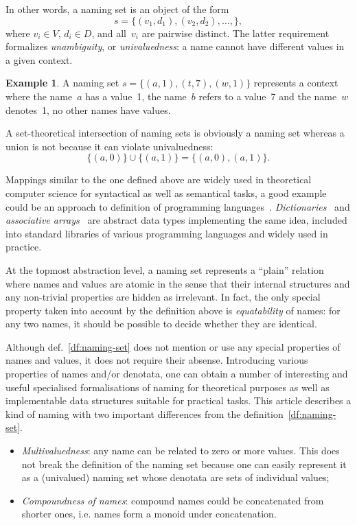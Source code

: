 \documentclass{article}
\theoremstyle{definition}
\newtheorem{Ex}{Example}
\begin{document}
In other words, a naming set is an object of the form
\[
  s = \{ (v_1, d_1), (v_2, d_2), \ldots, \} ,
\]
where $v_i\in V$, $d_i\in D$, and all~$v_i$ are pairwise distinct. The
latter requirement formalizes \emph{unambiguity}, or \emph{univaluedness}: a
name cannot have different values in a given context.

\begin{Ex}\label{ex:naming-set}
A naming set $s = \{ (a, 1), (t, 7), (w, 1) \}$ represents a context where
the name~$a$ has a value~1, the name~$b$ refers to a value~7 and the name~$w$
denotes~1, no other names have values.
\end{Ex}

A set-theoretical intersection  of naming sets is obviously a naming set
whereas a union is not because it can violate univaluedness:
\[
  \{ (a, 0) \} \cup \{ (a, 1) \} = \{ (a, 0), (a, 1) \} .
\]

Mappings similar to the one defined above are widely used in theoretical
computer science for syntactical as well as semantical tasks, a good example
could be an approach to definition of programming
languages~\cite{bib:ollongren}.  \emph{Dictionaries}~\cite{bib:dictionary} and
\emph{associative arrays}~\cite{bib:mehlhorn-assoc} are abstract data types
implementing the same idea, included into standard libraries of various
programming languages and widely used in practice.

At the topmost abstraction level, a naming set represents a ``plain'' relation
where names and values are atomic in the sense that their internal structures
and any non-trivial properties are hidden as irrelevant.  In fact, the only
special property taken into account by the definition above is
\emph{equatability} of names: for any two names, it should be possible to
decide whether they are identical.

Although def.~\ref{df:naming-set} does not mention or use any special properties
of names and values, it does not require their absense.
Introducing various properties of names and/or denotata, one can obtain a
number of interesting and useful specialised formalisations of naming for
theoretical purposes as well as implementable data structures suitable for
practical tasks. This article describes a kind of naming with
two important differences from the definition~\ref{df:naming-set}.
\begin{itemize}
\item \emph{Multivaluedness}: any name can be related to zero or more values.
This does not break the definition of the naming set because one can easily
represent it as a (univalued) naming set whose denotata are sets of individual
values;
\item \emph{Compoundness of names}: compound names could be concatenated from
shorter ones, i.e. names form a monoid under concatenation.
\end{itemize}
\end{document}

